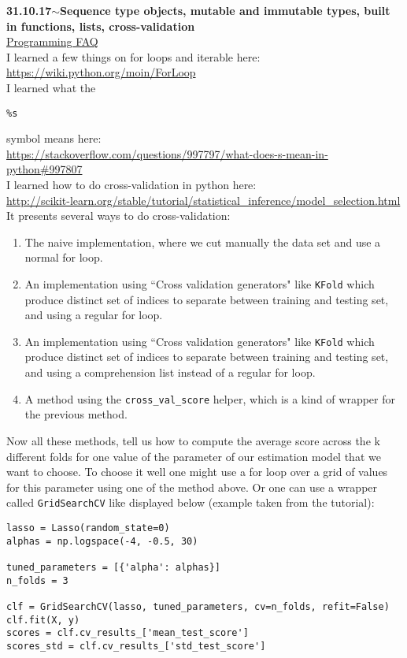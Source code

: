 \documentclass[11pt,a4paper]{article}
\newenvironment{loggentry}[2]%
{\noindent\textbf{#1}\hspace{1cm}$\mathbf{\sim}$\text{ }\textbf{#2}\\}{\vspace{0.5cm}}
\begin{document}
\begin{loggentry}{31.10.17}{Sequence type objects, mutable and immutable types, built in functions, lists, cross-validation}
\href{https://docs.python.org/3.6/faq/programming.html#faq-multidimensional-list}{Programming FAQ}\\
I learned a few things on for loops and iterable here:\\
\url{https://wiki.python.org/moin/ForLoop}\\
I learned what the
\begin{verbatim}
%s
\end{verbatim}
symbol means here:\\
\url{https://stackoverflow.com/questions/997797/what-does-s-mean-in-python#997807}\\
I learned how to do cross-validation in python here:\\
\url{http://scikit-learn.org/stable/tutorial/statistical_inference/model_selection.html}
It presents several ways to do cross-validation:
\begin{enumerate}
\item The naive implementation, where we cut manually the data set and use a normal for loop.
\item An implementation using ``Cross validation generators" like \texttt{KFold} which produce distinct set of indices to separate between training and testing set, and using a regular for loop.
\item An implementation using ``Cross validation generators" like \texttt{KFold} which produce distinct set of indices to separate between training and testing set, and using a comprehension list instead of a regular for loop.
\item A method using the \texttt{cross\_val\_score} helper, which is a kind of wrapper for the previous method.
\end{enumerate}
Now all these methods, tell us how to compute the average score across the k different folds for one value of the parameter of our estimation model that we want to choose. To choose it well one might use a for loop over a grid of values for this parameter using one of the method above. Or one can use a wrapper called \texttt{GridSearchCV} like displayed below (example taken from the tutorial):
\begin{verbatim}
lasso = Lasso(random_state=0)
alphas = np.logspace(-4, -0.5, 30)

tuned_parameters = [{'alpha': alphas}]
n_folds = 3

clf = GridSearchCV(lasso, tuned_parameters, cv=n_folds, refit=False)
clf.fit(X, y)
scores = clf.cv_results_['mean_test_score']
scores_std = clf.cv_results_['std_test_score']
\end{verbatim}
\end{loggentry}
\end{document}
